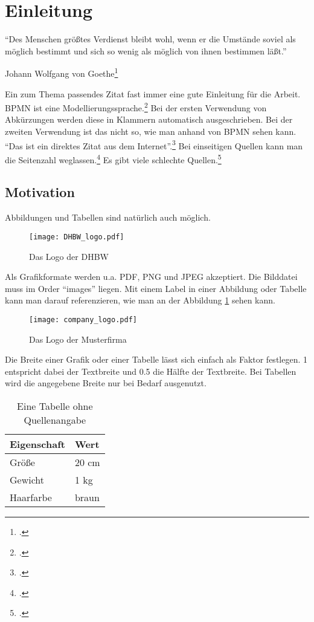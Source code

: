 \section{Einleitung}
\epigraph{"`Des Menschen größtes Verdienst bleibt wohl, wenn er die Umstände soviel als möglich bestimmt und sich so wenig als möglich von ihnen bestimmen läßt."'}{Johann Wolfgang von Goethe\footcite[S. 10]{Freund2014}}
Ein zum Thema passendes Zitat fast immer eine gute Einleitung für die Arbeit. 
\ac{BPMN} ist eine Modellierungssprache.\footcite[Vgl.][S. 1]{Freund2014} Bei der ersten Verwendung von Abkürzungen werden diese in Klammern automatisch ausgeschrieben. 
Bei der zweiten Verwendung ist das nicht so, wie man anhand von \ac{BPMN} sehen kann. "`Das ist ein direktes Zitat aus dem Internet"'.\footcite[S. 3]{OMG2018}
Bei einseitigen Quellen kann man die Seitenzahl weglassen.\footcite[Vgl.][]{schlechteQuelle}
Es gibt viele schlechte Quellen.\footcite[Vgl.][S. 1-3]{schlechteQuelle2}

\subsection{Motivation}
Abbildungen und Tabellen sind natürlich auch möglich.

\begin{figure}[H]
  \centering
	\texttt{[image: DHBW\_logo.pdf]}
   \caption[Das Logo der DHBW]{Das Logo der DHBW\footnotemark}
\end{figure}

Als Grafikformate werden u.a. PDF, PNG und JPEG akzeptiert. Die Bilddatei muss im Order "`images"' liegen.
Mit einem Label in einer Abbildung oder Tabelle kann man darauf referenzieren, wie man an der Abbildung \ref{AbbildungLogoMusterfirma} sehen kann.
\begin{figure}[H]
  \centering
	\texttt{[image: company\_logo.pdf]}
   \caption[Das Logo der Musterfirma]{Das Logo der Musterfirma\protect\footnotemark}
   \label{AbbildungLogoMusterfirma}
\end{figure}

Die Breite einer Grafik oder einer Tabelle lässt sich einfach als Faktor festlegen. 1 entspricht dabei der Textbreite und 0.5 die Hälfte der Textbreite.
Bei Tabellen wird die angegebene Breite nur bei Bedarf ausgenutzt.

\begin{table}[H]
  \centering
  \begin{tabulary}{0.7\textwidth}{|L|L|}
  \hline 
  Eigenschaft & Wert \\ 
  \hline 
  Größe & 20 cm \\ 
  \hline 
  Gewicht & 1 kg \\
  \hline
  Haarfarbe & braun \\  
  \hline 
  \end{tabulary} 
  \caption[Eine Tabelle ohne Quellenangabe]{Eine Tabelle ohne Quellenangabe}
\end{table}


